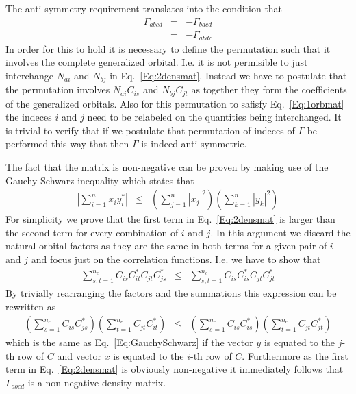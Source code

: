 \documentclass[pra]{revtex4-1}
\begin{document}
The anti-symmetry requirement translates into the condition that
\begin{eqnarray}
   \Gamma_{abcd} &=& - \Gamma_{bacd} \\
                 &=& - \Gamma_{abdc}
\end{eqnarray}
In order for this to hold it is necessary to define the permutation such that
it involves the complete generalized orbital. I.e. it is not permisible to just
interchange $N_{ai}$ and $N_{bj}$ in Eq.~\ref{Eq:2densmat}. Instead we have to
postulate that the permutation involves $N_{ai}C_{is}$ and $N_{bj}C_{jt}$ as
together they form the coefficients of the generalized orbitals. Also for this
permutation to safisfy Eq.~\ref{Eq:1orbmat} the indeces $i$ and $j$ need to be
relabeled on the quantities being interchanged. It is trivial to verify that
if we postulate that permutation of indeces of $\Gamma$ be performed this way
that then $\Gamma$ is indeed anti-symmetric.

The fact that the matrix is non-negative can be proven by making use of the
Gauchy-Schwarz inequality which states that
\begin{eqnarray}
  \left|\sum_{i=1}^n x_i y_i^*\right| 
  &\leq& \left(\sum_{j=1}^n|x_j|^2\right)\left(\sum_{k=1}^n|y_k|^2\right)
  \label{Eq:GauchySchwarz}
\end{eqnarray}
For simplicity we prove that the first term in Eq.~\ref{Eq:2densmat} is larger
than the second term for every combination of $i$ and $j$. In this argument we
discard the natural orbital factors as they are the same in both terms for a
given pair of $i$ and $j$ and focus just on the correlation functions.
I.e. we have to show that 
\begin{eqnarray}
  \sum_{s,t=1}^{n_e} C_{is}C^*_{it}C_{jt}C^*_{js} &\leq&
  \sum_{s,t=1}^{n_e} C_{is}C^*_{is}C_{jt}C^*_{jt} 
\end{eqnarray}
By trivially rearranging the factors and the summations this expression can be
rewritten as
\begin{eqnarray}
  \left(\sum_{s=1}^{n_e} C_{is}C^*_{js}\right)
  \left(\sum_{t=1}^{n_e}C_{jt}C^*_{it}\right) &\leq&
  \left(\sum_{s=1}^{n_e} C_{is}C^*_{is}\right)
  \left(\sum_{t=1}^{n_e}C_{jt}C^*_{jt}\right) 
\end{eqnarray}
which is the same as Eq.~\ref{Eq:GauchySchwarz} if the vector $y$ is equated to
the $j$-th row of $C$ and vector $x$ is equated to the $i$-th row of $C$.
Furthermore as the first term in Eq.~\ref{Eq:2densmat} is obviously 
non-negative it immediately follows that $\Gamma_{abcd}$ is a non-negative
density matrix.
\end{document}
